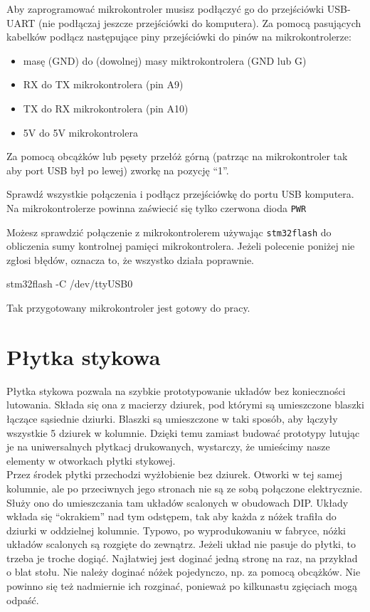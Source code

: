 \documentclass{pdfBooklets}
\begin{document}
Aby zaprogramować mikrokontroler musisz podłączyć go do przejściówki USB-UART (nie podłączaj jeszcze
przejściówki do komputera).
Za pomocą pasujących kabelków podłącz następujące piny przejściówki do pinów na mikrokontrolerze:
\begin{itemize}
\item masę (GND) do (dowolnej) masy miktrokontrolera (GND lub G)
\item RX do TX mikrokontrolera (pin A9)
\item TX do RX mikrokontrolera (pin A10)
\item 5V do 5V mikrokontrolera
\end{itemize}

Za pomocą obcążków lub pęsety przełóż górną (patrząc na mikrokontroler tak aby port USB był po lewej) zworkę na
pozycję ``1''.

Sprawdź wszystkie połączenia i podłącz przejściówkę do portu USB komputera. Na mikrokontrolerze powinna zaświecić się tylko czerwona dioda
\texttt{PWR}

Możesz sprawdzić połączenie z mikrokontrolerem używając \Verb$stm32flash$ do obliczenia sumy kontrolnej pamięci mikrokontrolera.
Jeżeli polecenie poniżej nie zgłosi błędów, oznacza to, że wszystko działa poprawnie.

\begin{CodeFrame*}[bash]{}
stm32flash -C /dev/ttyUSB0
\end{CodeFrame*}

Tak przygotowany mikrokontroler jest gotowy do pracy.


\section{Płytka stykowa}
Płytka stykowa pozwala na szybkie prototypowanie układów bez konieczności lutowania. Składa się ona z macierzy dziurek,
pod którymi są umieszczone blaszki łączące sąsiednie dziurki. Blaszki są umieszczone w taki sposób, aby łączyły wszystkie
5 dziurek w kolumnie. Dzięki temu zamiast budować prototypy lutując je na uniwersalnych płytkacj drukowanych, wystarczy, że
umieścimy nasze elementy w otworkach płytki stykowej. 
\\

Przez środek płytki przechodzi wyżłobienie bez dziurek. Otworki w tej samej kolumnie, ale po przeciwnych jego
stronach nie są ze sobą połączone elektrycznie. Służy ono do umieszczania tam układów scalonych w obudowach DIP.
Układy wkłada się ``okrakiem'' nad tym odstępem, tak aby każda z nóżek trafiła do dziurki w oddzielnej kolumnie.
Typowo, po wyprodukowaniu w fabryce, nóżki układów scalonych są rozgięte do zewnątrz. Jeżeli układ nie pasuje do płytki,
to trzeba je troche dogiąć.
Najłatwiej jest doginać jedną stronę na raz, na przykład o blat stołu. Nie należy doginać nóżek pojedynczo, np. za pomocą obcążków.
Nie powinno się też nadmiernie ich rozginać, ponieważ po kilkunastu zgięciach mogą odpaść.
\\
\end{document}
